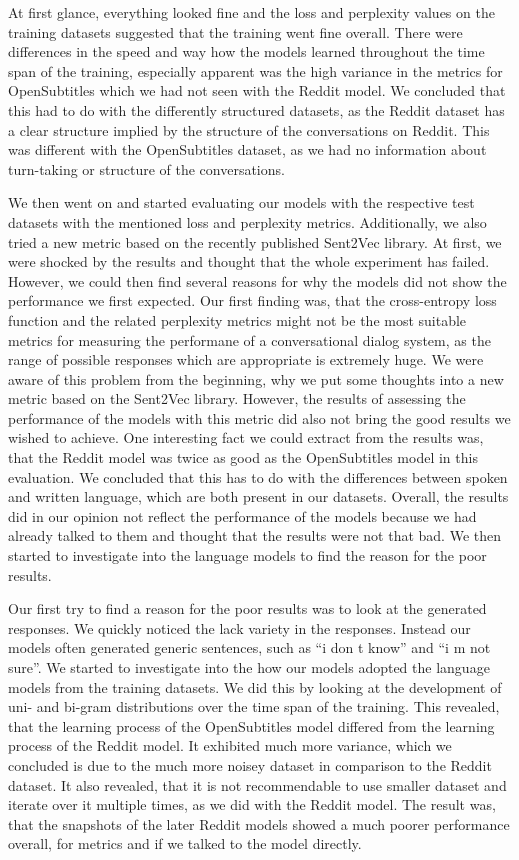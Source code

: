 At first glance, everything looked fine and the loss and perplexity values on the training datasets suggested that the training went fine overall. There were differences in the speed and way how the models learned throughout the time span of the training, especially apparent was the high variance in the metrics for OpenSubtitles which we had not seen with the Reddit model. We concluded that this had to do with the differently structured datasets, as the Reddit dataset has a clear structure implied by the structure of the conversations on Reddit. This was different with the OpenSubtitles dataset, as we had no information about turn-taking or structure of the conversations.

We then went on and started evaluating our models with the respective test datasets with the mentioned loss and perplexity metrics. Additionally, we also tried a new metric based on the recently published Sent2Vec library. At first, we were shocked by the results and thought that the whole experiment has failed. However, we could then find several reasons for why the models did not show the performance we first expected. Our first finding was, that the cross-entropy loss function and the related perplexity metrics might not be the most suitable metrics for measuring the performane of a conversational dialog system, as the range of possible responses which are appropriate is extremely huge. We were aware of this problem from the beginning, why we put some thoughts into a new metric based on the Sent2Vec library. However, the results of assessing the performance of the models with this metric did also not bring the good results we wished to achieve. One interesting fact we could extract from the results was, that the Reddit model was twice as good as the OpenSubtitles model in this evaluation. We concluded that this has to do with the differences between spoken and written language, which are both present in our datasets. Overall, the results did in our opinion not reflect the performance of the models because we had already talked to them and thought that the results were not that bad. We then started to investigate into the language models to find the reason for the poor results.

Our first try to find a reason for the poor results was to look at the generated responses. We quickly noticed the lack variety in the responses. Instead our models often generated generic sentences, such as ``i don t know'' and ``i m not sure''. We started to investigate into the how our models adopted the language models from the training datasets. We did this by looking at the development of uni- and bi-gram distributions over the time span of the training. This revealed, that the learning process of the OpenSubtitles model differed from the learning process of the Reddit model. It exhibited much more variance, which we concluded is due to the much more noisey dataset in comparison to the Reddit dataset. It also revealed, that it is not recommendable to use smaller dataset and iterate over it multiple times, as we did with the Reddit model. The result was, that the snapshots of the later Reddit models showed a much poorer performance overall, for metrics and if we talked to the model directly.

